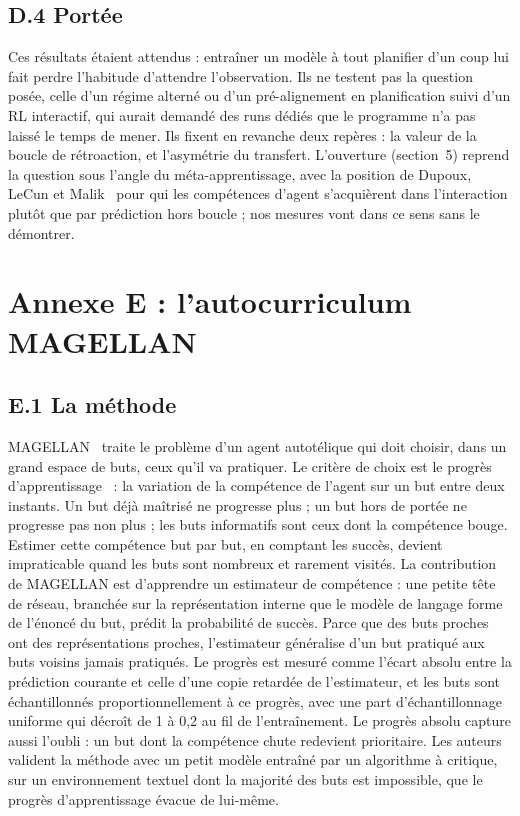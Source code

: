 \documentclass[11pt,a4paper]{article}
\begin{document}
\subsection*{D.4 Portée}
Ces résultats étaient attendus : entraîner un modèle à tout planifier d'un coup lui fait perdre l'habitude d'attendre l'observation. Ils ne testent pas la question posée, celle d'un régime alterné ou d'un pré-alignement en planification suivi d'un RL interactif, qui aurait demandé des runs dédiés que le programme n'a pas laissé le temps de mener. Ils fixent en revanche deux repères : la valeur de la boucle de rétroaction, et l'asymétrie du transfert. L'ouverture (section~5) reprend la question sous l'angle du méta-apprentissage, avec la position de Dupoux, LeCun et Malik~\cite{dupoux2026why} pour qui les compétences d'agent s'acquièrent dans l'interaction plutôt que par prédiction hors boucle ; nos mesures vont dans ce sens sans le démontrer.

\section{Annexe E : l'autocurriculum MAGELLAN}
\label{annexe:magellan}

\subsection*{E.1 La méthode}
MAGELLAN~\cite{gaven2025magellan} traite le problème d'un agent autotélique qui doit choisir, dans un grand espace de buts, ceux qu'il va pratiquer. Le critère de choix est le progrès d'apprentissage~\cite{graves2017automated} : la variation de la compétence de l'agent sur un but entre deux instants. Un but déjà maîtrisé ne progresse plus ; un but hors de portée ne progresse pas non plus ; les buts informatifs sont ceux dont la compétence bouge. Estimer cette compétence but par but, en comptant les succès, devient impraticable quand les buts sont nombreux et rarement visités. La contribution de MAGELLAN est d'apprendre un estimateur de compétence : une petite tête de réseau, branchée sur la représentation interne que le modèle de langage forme de l'énoncé du but, prédit la probabilité de succès. Parce que des buts proches ont des représentations proches, l'estimateur généralise d'un but pratiqué aux buts voisins jamais pratiqués. Le progrès est mesuré comme l'écart absolu entre la prédiction courante et celle d'une copie retardée de l'estimateur, et les buts sont échantillonnés proportionnellement à ce progrès, avec une part d'échantillonnage uniforme qui décroît de 1 à 0{,}2 au fil de l'entraînement. Le progrès absolu capture aussi l'oubli : un but dont la compétence chute redevient prioritaire. Les auteurs valident la méthode avec un petit modèle entraîné par un algorithme à critique, sur un environnement textuel dont la majorité des buts est impossible, que le progrès d'apprentissage évacue de lui-même.
\end{document}
